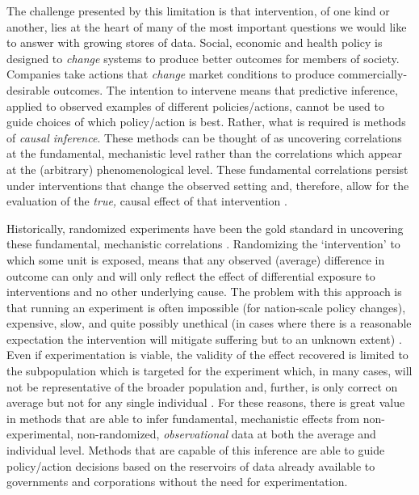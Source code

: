 \documentclass[../main.tex]{subfiles}
\begin{document}
\vspace{\baselineskip}
The challenge presented by this limitation is that intervention, of one kind or another, lies at the heart of many of the most important questions we would like to answer with growing stores of data. Social, economic and health policy is designed to \textit{change} systems to produce better outcomes for members of society. Companies take actions that \textit{change} market conditions to produce commercially-desirable outcomes. The intention to intervene means that predictive inference, applied to observed examples of different policies/actions, cannot be used to guide choices of which policy/action is best. Rather, what is required is methods of \textit{causal inference}. These methods can be thought of as uncovering correlations at the fundamental, mechanistic level rather than the correlations which appear at the (arbitrary) phenomenological level. These fundamental correlations persist under interventions that change the observed setting and, therefore, allow for the evaluation of the \textit{true, }causal\textit{ }effect of that intervention \parencite{Scholkopf2019CausalityLearning}.\par


\vspace{\baselineskip}
Historically, randomized experiments have been the gold standard in uncovering these fundamental, mechanistic correlations \parencite{Meldrum2000AStandard}. Randomizing the ‘intervention’ to which some unit is exposed, means that any observed (average) difference in outcome can only and will only reflect the effect of differential exposure to interventions and no other underlying cause. The problem with this approach is that running an experiment is often impossible (for nation-scale policy changes), expensive, slow, and quite possibly unethical (in cases where there is a reasonable expectation the intervention will mitigate suffering but to an unknown extent) \parencite{Meldrum2000AStandard}. Even if experimentation is viable, the validity of the effect recovered is limited to the subpopulation which is targeted for the experiment which, in many cases, will not be representative of the broader population and, further, is only correct on average but not for any single individual \parencite{Rothwell2006FactorsTrials}. For these reasons, there is great value in methods that are able to infer fundamental, mechanistic effects from non-experimental, non-randomized, \textit{observational} data at both the average and individual level. Methods that are capable of this inference are able to guide policy/action decisions based on the reservoirs of data already available to governments and corporations without the need for experimentation.\par
\end{document}
